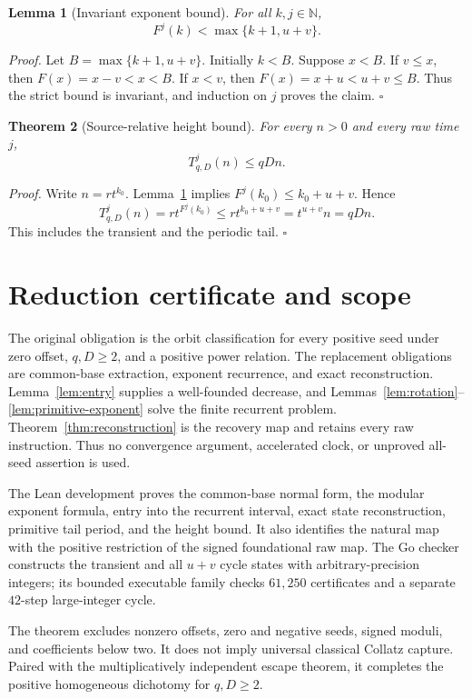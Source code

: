 \documentclass[11pt,letterpaper]{article}
\newcommand{\N}{\mathbb{N}}
\newtheorem{theorem}{Theorem}
\newtheorem{lemma}[theorem]{Lemma}
\newenvironment{proof}{\noindent\textit{Proof.}}{\hfill\(\square\)}
\begin{document}
\begin{lemma}[Invariant exponent bound]
\label{lem:exponent-bound}
For all $k,j\in\N$,
\[
 F^j(k)<\max\{k+1,u+v\}.
\]
\end{lemma}

\begin{proof}
Let $B=\max\{k+1,u+v\}$.  Initially $k<B$.  Suppose $x<B$.
If $v\leq x$, then $F(x)=x-v<x<B$.  If $x<v$, then
$F(x)=x+u<u+v\leq B$.  Thus the strict bound is invariant, and induction on
$j$ proves the claim.
\end{proof}

\begin{theorem}[Source-relative height bound]
\label{thm:height}
For every $n>0$ and every raw time $j$,
\[
 T_{q,D}^j(n)\leq qDn.
\]
\end{theorem}

\begin{proof}
Write $n=rt^{k_0}$.  Lemma~\ref{lem:exponent-bound} implies
$F^j(k_0)\leq k_0+u+v$.  Hence
\[
 T_{q,D}^j(n)
 =rt^{F^j(k_0)}
 \leq rt^{k_0+u+v}
 =t^{u+v}n
 =qDn.
\]
This includes the transient and the periodic tail.
\end{proof}

\section{Reduction certificate and scope}

The original obligation is the orbit classification for every positive seed
under zero offset, $q,D\geq2$, and a positive power relation.  The replacement
obligations are common-base extraction, exponent recurrence, and exact
reconstruction.  Lemma~\ref{lem:entry} supplies a well-founded decrease, and
Lemmas~\ref{lem:rotation}--\ref{lem:primitive-exponent} solve the finite
recurrent problem.  Theorem~\ref{thm:reconstruction} is the recovery map and
retains every raw instruction.  Thus no convergence argument, accelerated
clock, or unproved all-seed assertion is used.

The Lean development proves the common-base normal form, the modular exponent
formula, entry into the recurrent interval, exact state reconstruction,
primitive tail period, and the height bound.  It also identifies the natural
map with the positive restriction of the signed foundational raw map.  The Go
checker constructs the transient and all $u+v$ cycle states with
arbitrary-precision integers; its bounded executable family checks $61{,}250$
certificates and a separate $42$-step large-integer cycle.

The theorem excludes nonzero offsets, zero and negative seeds, signed
moduli, and coefficients below two.  It does not imply universal classical
Collatz capture.  Paired with the multiplicatively independent escape theorem,
it completes the positive homogeneous dichotomy for $q,D\geq2$.



\end{document}
